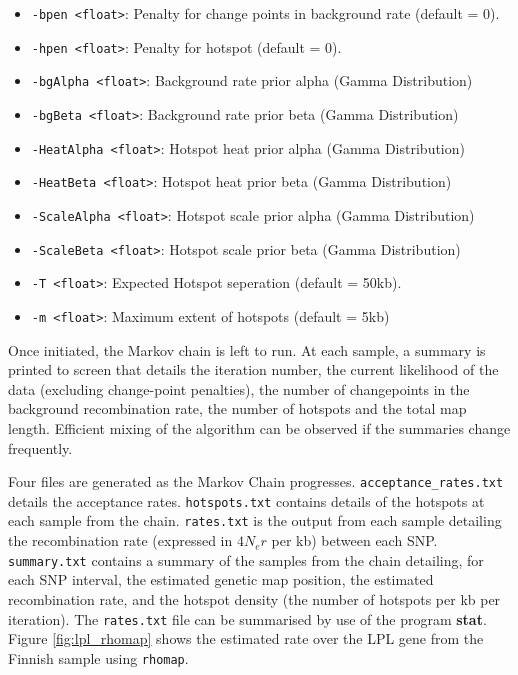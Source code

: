\documentclass[a4paper,10pt,fullpage]{article}
\begin{document}
\begin{itemize}

\item \verb+-bpen <float>+: Penalty for change points in background rate (default = 0).

\item \verb+-hpen <float>+: Penalty for hotspot (default = 0).

\item \verb+-bgAlpha <float>+:          Background rate prior alpha (Gamma Distribution)
\item \verb+-bgBeta <float>+:           Background rate prior beta (Gamma Distribution)
\item \verb+-HeatAlpha <float>+:        Hotspot heat prior alpha (Gamma Distribution)
\item \verb+-HeatBeta <float>+:         Hotspot heat prior beta (Gamma Distribution)
\item \verb+-ScaleAlpha <float>+:       Hotspot scale prior alpha (Gamma Distribution)
\item \verb+-ScaleBeta <float>+:        Hotspot scale prior beta (Gamma Distribution)
\item \verb+-T <float>+:                Expected Hotspot seperation (default = 50kb).
\item \verb+-m <float>+:                Maximum extent of hotspots (default = 5kb)

\end{itemize}



\noindent  Once initiated, the Markov chain is left to run.  At
each sample, a summary is printed to screen that details the
iteration number, the current likelihood of the data (excluding
change-point penalties), the number of changepoints in the background recombination rate, the number of hotspots and the total map length.  Efficient mixing of the algorithm can be observed if the
summaries change frequently.

Four files are generated as the Markov Chain progresses.  {\verb+acceptance_rates.txt+} details the acceptance rates.  {\verb+hotspots.txt+} contains details of the hotspots at each sample from the chain.  {\verb+rates.txt+} is the output from each sample detailing the
recombination rate (expressed in $4N_er$ per kb) between each SNP. {\verb+summary.txt+} contains a summary of the samples from the chain detailing, for each SNP interval, the estimated genetic map position, the estimated recombination rate, and the hotspot density (the number of hotspots per kb per iteration).  The {\verb+rates.txt+} file can be summarised by use of the program {\bf stat}.  Figure \ref{fig:lpl_rhomap} shows the estimated rate over the LPL gene from the Finnish sample using \verb+rhomap+.  
\end{document}
